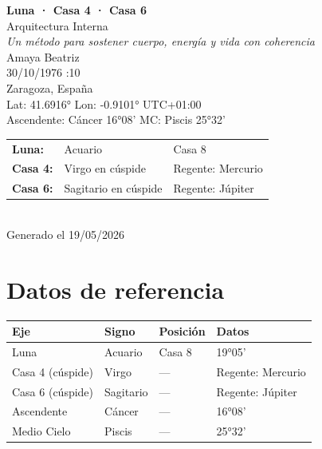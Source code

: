 \documentclass[11pt,a4paper]{article}
\begin{document}
\begin{titlepage}
  \centering
  \vspace*{1.5cm}
  {\Huge\bfseries\color{azulai} Luna · Casa 4 · Casa 6}\\[0.5cm]
  {\large\color{grisai} Arquitectura Interna}\\[0.3cm]
  {\small\itshape\color{grisai} Un método para sostener cuerpo, energía y vida con coherencia}\\[2cm]
  {\huge\color{doradoai} Amaya Beatriz}\\[1.5cm]
  {\Large 30/10/1976 :10}\\[0.3cm]
  {\Large Zaragoza, España}\\[0.3cm]
  {\normalsize Lat: 41.6916° \quad Lon: -0.9101° \quad UTC+01:00}\\[0.3cm]
  {\normalsize Ascendente: Cáncer 16°08' \quad
    MC: Piscis 25°32'}\\[2cm]

  \begin{tabular}{lll}
    \textbf{Luna:} & Acuario & Casa 8 \\
    \textbf{Casa 4:} & Virgo en cúspide & Regente: Mercurio \\
    \textbf{Casa 6:} & Sagitario en cúspide & Regente: Júpiter \\
  \end{tabular}\\[2cm]

  \vfill
  {\small Generado el 19/05/2026}
\end{titlepage}

\tableofcontents
\clearpage

\section{Datos de referencia}

\begin{center}
\begin{tabular}{llll}
  \toprule
  \textbf{Eje} & \textbf{Signo} & \textbf{Posición} & \textbf{Datos} \\
  \midrule
  Luna & Acuario & Casa 8 & 19°05' \\
  Casa 4 (cúspide) & Virgo & --- & Regente: Mercurio \\
  Casa 6 (cúspide) & Sagitario & --- & Regente: Júpiter \\
  Ascendente & Cáncer & --- & 16°08' \\
  Medio Cielo & Piscis & --- & 25°32' \\
  \bottomrule
\end{tabular}
\end{center}
\end{document}

